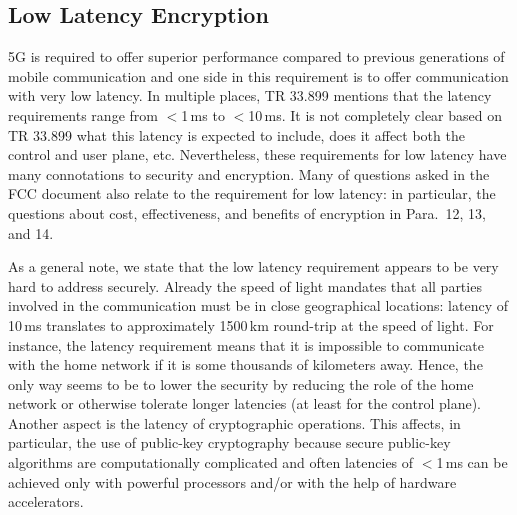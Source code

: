 \documentclass[lnicst,sechang,a4paper]{svmultln}
\begin{document}
\subsection{Low Latency Encryption}
\label{sec:latency}

5G is required to offer superior performance compared to previous generations of mobile communication and one side in this requirement is to offer communication with very low latency. In multiple places, TR 33.899 mentions that the latency requirements range from $<$1\,ms to $<$10\,ms. It is not completely clear based on TR 33.899 what this latency is expected to include, does it affect both the control and user plane, etc. Nevertheless, these requirements for low latency have many connotations to security and encryption. Many of questions asked in the FCC document also relate to the requirement for low latency: in particular, the questions about cost, effectiveness, and benefits of encryption in Para.~12, 13, and 14. 

As a general note, we state that the low latency requirement appears to be very hard to address securely. Already the speed of light mandates that all parties involved in the communication must be in close geographical locations: latency of 10\,ms translates to approximately 1500\,km round-trip at the speed of light. For instance, the latency requirement means that it is impossible to communicate with the home network if it is some thousands of kilometers away. Hence, the only way seems to be to lower the security by reducing the role of the home network or otherwise tolerate longer latencies (at least for the control plane). Another aspect is the latency of cryptographic operations. This affects, in particular, the use of public-key cryptography because secure public-key algorithms are computationally complicated and often latencies of $<$1\,ms can be achieved only with powerful processors and/or with the help of hardware accelerators. 
\end{document}
